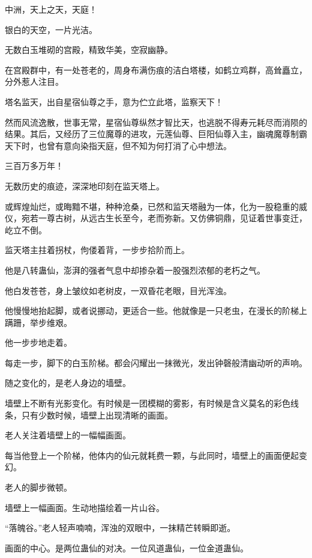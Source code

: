 
\begin{this_body}

中洲，天上之天，天庭！

银白的天空，一片光洁。

无数白玉堆砌的宫殿，精致华美，空寂幽静。

在宫殿群中，有一处苍老的，周身布满伤痕的洁白塔楼，如鹤立鸡群，高耸矗立，分外惹人注目。

塔名监天，出自星宿仙尊之手，意为伫立此塔，监察天下！

然而风流逸散，世事无常，星宿仙尊纵然才智比天，也逃脱不得寿元耗尽而消陨的结果。其后，又经历了三位魔尊的进攻，元莲仙尊、巨阳仙尊入主，幽魂魔尊制霸天下时，也曾有意向染指天庭，但不知为何打消了心中想法。

三百万多万年！

无数历史的痕迹，深深地印刻在监天塔上。

或辉煌灿烂，或晦黯不堪，种种沧桑，已然和监天塔融为一体，化为一股稳重的威仪，宛若一尊古树，从远古生长至今，老而弥新。又仿佛铜鼎，见证着世事变迁，屹立不倒。

监天塔主拄着拐杖，佝偻着背，一步步拾阶而上。

他是八转蛊仙，澎湃的强者气息中却掺杂着一股强烈浓郁的老朽之气。

他白发苍苍，身上皱纹如老树皮，一双昏花老眼，目光浑浊。

他慢慢地抬起脚，或者说挪动，更适合一些。他就像是一只老虫，在漫长的阶梯上蹒跚，举步维艰。

他一步步地走着。

每走一步，脚下的白玉阶梯。都会闪耀出一抹微光，发出钟磬般清幽动听的声响。

随之变化的，是老人身边的墙壁。

墙壁上不断有光影变化。有时候是一团模糊的雾影，有时候是含义莫名的彩色线条，只有少数时候，墙壁上出现清晰的画面。

老人关注着墙壁上的一幅幅画面。

每当他登上一个阶梯，他体内的仙元就耗费一颗，与此同时，墙壁上的画面便起变幻。

老人的脚步微顿。

墙壁上一幅画面。生动地描绘着一片山谷。

“落魄谷。”老人轻声喃喃，浑浊的双眼中，一抹精芒转瞬即逝。

画面的中心。是两位蛊仙的对决。一位风道蛊仙，一位金道蛊仙。


\end{this_body}
